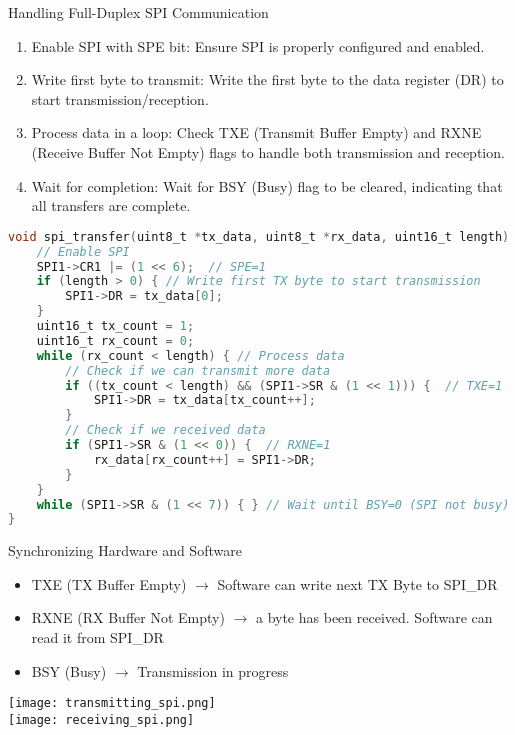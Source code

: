 \begin{KR}{Handling Full-Duplex SPI Communication}
    \begin{enumerate}
        \item Enable SPI with SPE bit: Ensure SPI is properly configured and enabled.
        \item Write first byte to transmit: Write the first byte to the data register (DR) to start transmission/reception.
        \item Process data in a loop: Check TXE (Transmit Buffer Empty) and RXNE (Receive Buffer Not Empty) flags to handle both transmission and reception.
        \item Wait for completion: Wait for BSY (Busy) flag to be cleared, indicating that all transfers are complete.
    \end{enumerate}

\begin{lstlisting}[language=C, style=basesmol]
void spi_transfer(uint8_t *tx_data, uint8_t *rx_data, uint16_t length) {
    // Enable SPI
    SPI1->CR1 |= (1 << 6);  // SPE=1
    if (length > 0) { // Write first TX byte to start transmission
        SPI1->DR = tx_data[0];
    }
    uint16_t tx_count = 1;
    uint16_t rx_count = 0;
    while (rx_count < length) { // Process data
        // Check if we can transmit more data
        if ((tx_count < length) && (SPI1->SR & (1 << 1))) {  // TXE=1
            SPI1->DR = tx_data[tx_count++];
        }
        // Check if we received data
        if (SPI1->SR & (1 << 0)) {  // RXNE=1
            rx_data[rx_count++] = SPI1->DR;
        }
    }
    while (SPI1->SR & (1 << 7)) { } // Wait until BSY=0 (SPI not busy)
}
\end{lstlisting}
\end{KR}

\begin{concept}{Synchronizing Hardware and Software}
    \begin{itemize}
        \item TXE (TX Buffer Empty) $\rightarrow$ Software can write next TX Byte to SPI\_DR
        \item RXNE (RX Buffer Not Empty) $\rightarrow$ a byte has been received. Software can read it from SPI\_DR
        \item BSY (Busy) $\rightarrow$ Transmission in progress
    \end{itemize}
    \texttt{[image: transmitting\_spi.png]}\\
    \texttt{[image: receiving\_spi.png]}
\end{concept}
    